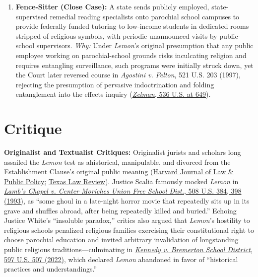 \documentclass[12pt]{article}
\begin{document}
\begin{enumerate}
\item \textbf{Fence-Sitter (Close Case):} A state sends publicly employed, state-supervised remedial reading specialists onto parochial school campuses to provide federally funded tutoring to low-income students in dedicated rooms stripped of religious symbols, with periodic unannounced visits by public-school supervisors. \textit{Why:} Under \textit{Lemon}'s original presumption that any public employee working on parochial-school grounds risks inculcating religion and requires entangling surveillance, such programs were initially struck down, yet the Court later reversed course in \textit{Agostini v. Felton}, 521 U.S. 203 (1997), rejecting the presumption of pervasive indoctrination and folding entanglement into the effects inquiry (\href{https://supreme.justia.com/cases/federal/us/536/639/}{\textit{Zelman}, 536 U.S. at 649}).
\end{enumerate}

\section{Critique}
\textbf{Originalist and Textualist Critiques:} Originalist jurists and scholars long assailed the \textit{Lemon} test as ahistorical, manipulable, and divorced from the Establishment Clause's original public meaning (\href{https://journals.law.harvard.edu/jlpp/a-little-noted-puzzle-in-religion-law-post-bremerton-gabrielle-girgis/}{Harvard Journal of Law \& Public Policy}; \href{https://texaslawreview.org/applying-history-as-law-the-role-of-historical-facts-in-implementing-constitutional-doctrine/}{Texas Law Review}). Justice Scalia famously mocked \textit{Lemon} in \href{https://supreme.justia.com/cases/federal/us/508/384/}{\textit{Lamb's Chapel v. Center Moriches Union Free School Dist.}, 508 U.S. 384, 398 (1993)}, as ``some ghoul in a late-night horror movie that repeatedly sits up in its grave and shuffles abroad, after being repeatedly killed and buried.'' Echoing Justice White's ``insoluble paradox,'' critics also argued that \textit{Lemon}'s hostility to religious schools penalized religious families exercising their constitutional right to choose parochial education and invited arbitrary invalidation of longstanding public religious traditions---culminating in \href{https://supreme.justia.com/cases/federal/us/597/21-418/}{\textit{Kennedy v. Bremerton School District}, 597 U.S. 507 (2022)}, which declared \textit{Lemon} abandoned in favor of ``historical practices and understandings.''
\end{document}
